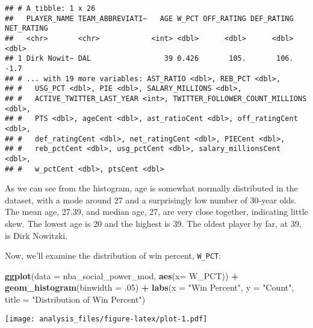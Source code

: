 \documentclass[]{article}
\newenvironment{Shaded}{\begin{snugshade}}{\end{snugshade}}
\newcommand{\DataTypeTok}[1]{\textcolor[rgb]{0.13,0.29,0.53}{#1}}
\newcommand{\FloatTok}[1]{\textcolor[rgb]{0.00,0.00,0.81}{#1}}
\newcommand{\KeywordTok}[1]{\textcolor[rgb]{0.13,0.29,0.53}{\textbf{#1}}}
\newcommand{\NormalTok}[1]{#1}
\newcommand{\OperatorTok}[1]{\textcolor[rgb]{0.81,0.36,0.00}{\textbf{#1}}}
\newcommand{\StringTok}[1]{\textcolor[rgb]{0.31,0.60,0.02}{#1}}
\begin{document}
\begin{verbatim}
## # A tibble: 1 x 26
##   PLAYER_NAME TEAM_ABBREVIATI~   AGE W_PCT OFF_RATING DEF_RATING NET_RATING
##   <chr>       <chr>            <int> <dbl>      <dbl>      <dbl>      <dbl>
## 1 Dirk Nowit~ DAL                 39 0.426       105.       106.       -1.7
## # ... with 19 more variables: AST_RATIO <dbl>, REB_PCT <dbl>,
## #   USG_PCT <dbl>, PIE <dbl>, SALARY_MILLIONS <dbl>,
## #   ACTIVE_TWITTER_LAST_YEAR <int>, TWITTER_FOLLOWER_COUNT_MILLIONS <dbl>,
## #   PTS <dbl>, ageCent <dbl>, ast_ratioCent <dbl>, off_ratingCent <dbl>,
## #   def_ratingCent <dbl>, net_ratingCent <dbl>, PIECent <dbl>,
## #   reb_pctCent <dbl>, usg_pctCent <dbl>, salary_millionsCent <dbl>,
## #   w_pctCent <dbl>, ptsCent <dbl>
\end{verbatim}

As we can see from the histogram, age is somewhat normally distributed
in the dataset, with a mode around 27 and a surprisingly low number of
30-year olds. The mean age, 27.39, and median age, 27, are very close
together, indicating little skew. The lowest age is 20 and the highest
is 39. The oldest player by far, at 39, is Dirk Nowitzki.

Now, we'll examine the distribution of win percent, \texttt{W\_PCT}:

\begin{Shaded}
\begin{Highlighting}[]
\KeywordTok{ggplot}\NormalTok{(}\DataTypeTok{data =}\NormalTok{ nba_social_power_mod, }\KeywordTok{aes}\NormalTok{(}\DataTypeTok{x=}\NormalTok{ W_PCT)) }\OperatorTok{+}\StringTok{ }
\StringTok{  }\KeywordTok{geom_histogram}\NormalTok{(}\DataTypeTok{binwidth =} \FloatTok{.05}\NormalTok{) }\OperatorTok{+}
\StringTok{  }\KeywordTok{labs}\NormalTok{(}\DataTypeTok{x =} \StringTok{"Win Percent"}\NormalTok{, }\DataTypeTok{y =} \StringTok{"Count"}\NormalTok{, }\DataTypeTok{title =} \StringTok{"Distribution of Win Percent"}\NormalTok{)}
\end{Highlighting}
\end{Shaded}

\texttt{[image: analysis\_files/figure-latex/plot-1.pdf]}

\begin{Shaded}
\end{Shaded}
\end{document}
